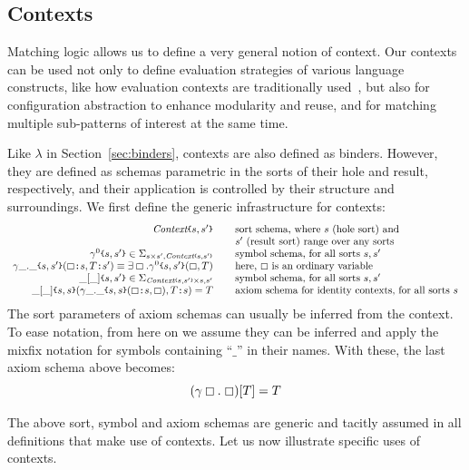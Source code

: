 \documentclass[UTF8,11pt]{article}
\theoremstyle{plain}
\theoremstyle{definition}
\theoremstyle{remark}
\newcommand{\cln}{\texttt{:}}
\newcommand{\Context}{\textit{Context}}
\newcommand{\hole}{\boxempty}
\newcommand{\parametric}[2]{{#1}\raisebox{.2ex}{\texttt{\footnotesize{\{}}}#2\raisebox{.2ex}{\texttt{\footnotesize{\}}}}}
\newcommand{\parametricscript}[2]{{#1}\raisebox{.2ex}{\texttt{\tiny{\{}}}#2\raisebox{.2ex}{\texttt{\tiny{\}}}}}
\begin{document}
\subsection{Contexts}

Matching logic allows us to define a very general notion of context.
Our contexts can be used not only to define evaluation strategies of
various language constructs, like how evaluation contexts are
traditionally used~\cite{felleisen-hieb-92}, but also for configuration
abstraction to enhance modularity and reuse, and for matching multiple
sub-patterns of interest at the same time.

Like $\lambda$ in Section~\ref{sec:binders}, contexts are also defined
as binders.
However, they are defined as schemas parametric in the sorts of their
hole and result, respectively, and their application is controlled by
their structure and surroundings.
We first define the generic infrastructure for contexts:
$$
\begin{array}{r@{\hspace*{5ex}}l}
\parametric{\Context}{s,s'} &
\textrm{sort schema, where $s$ (hole sort) and}
\\ &\textrm{$s'$ (result sort) range over any sorts}
\\ \parametric{\gamma^0}{s,s'} \in \Sigma_{s \times s', \parametricscript{\Context}{s,s'}}
& \textrm{symbol schema, for all sorts $s, s'$}
\\ \parametric{\gamma\_.\_}{s,s'}(\hole\cln s,T\cln s') \equiv \exists \hole . \parametric{\gamma^0}{s,s'}(\hole,T)
& \textrm{here, $\hole$ is an ordinary variable}
\\
\parametric{\_[\_]}{s,s'} \in \Sigma_{\parametricscript{\Context}{s,s'} \times s, s'}
& \textrm{symbol schema, for all sorts $s, s'$}
\\
\parametric{\_[\_]}{s,s}(\parametric{\gamma\_.\_}{s,s}(\hole\cln s, \hole),T\cln s) = T
& \textrm{axiom schema for identity contexts, for all sorts $s$}
\end{array}
$$
The sort parameters of axiom schemas can usually be inferred from the context.
To ease notation, from here on we assume they can be inferred and apply the
mixfix notation for symbols containing ``$\_$'' in their names.
With these, the last axiom schema above becomes:
$$
(\gamma \hole .\; \hole)[T] = T
$$

The above sort, symbol and axiom schemas are generic and tacitly assumed in
all definitions that make use of contexts.
Let us now illustrate specific uses of contexts.
\end{document}
